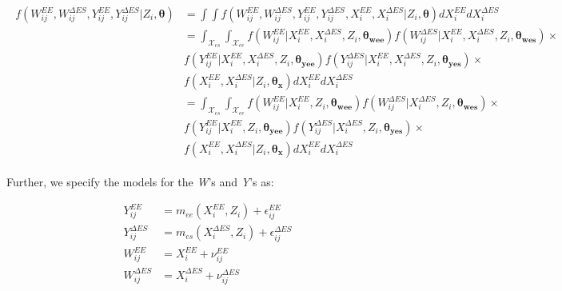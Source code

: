 \documentclass[11pt]{article}\usepackage[]{graphicx}\usepackage[]{color}
\begin{document}
\begin{align}
  \begin{split}
    \label{truedist}
  f({ W_{ij}^{EE},W_{ij}^{\Delta ES}, Y_{ij}^{EE},Y_{ij}^{\Delta ES}|Z_i},\boldsymbol{\theta}) &= \int \int f({ W_{ij}^{EE},W_{ij}^{\Delta ES}, Y_{ij}^{EE},Y_{ij}^{\Delta ES}, X_i^{EE}, X_i^{\Delta ES}|Z_i},\boldsymbol{\theta}) d{ X_i^{EE}} d{ X_i^{\Delta ES}} \\
    &= \int_{\mathcal{X}_{es}} \int_{\mathcal{X}_{ee}} f({ W_{ij}^{EE}|X_i^{EE},X_i^{\Delta ES},Z_i},\boldsymbol{\theta_{wee}}) f({ W_{ij}^{\Delta ES}|X_i^{EE},X_i^{\Delta ES},Z_i},\boldsymbol{\theta_{wes}}) \times\\
  & f({ Y_{ij}^{EE}|X_i^{EE},X_i^{\Delta ES},Z_i},\boldsymbol{\theta_{yee}}) f({ Y_{ij}^{\Delta ES}|X_i^{EE},X_i^{\Delta ES},Z_i},\boldsymbol{\theta_{yes}}) \times  \\
  & f({ X_i^{EE}, X_i^{\Delta ES}|Z_i},\boldsymbol{\theta_x}) d{ X_i^{EE}} d{ X_i^{\Delta ES}} \\
  &= \int_{\mathcal{X}_{es}} \int_{\mathcal{X}_{ee}} f({ W_{ij}^{EE}|X_i^{EE},Z_i},\boldsymbol{\theta_{wee}}) f({ W_{ij}^{\Delta ES}|X_i^{\Delta ES},Z_i},\boldsymbol{\theta_{wes}}) \times\\
  & f({ Y_{ij}^{EE}|X_i^{EE},Z_i},\boldsymbol{\theta_{yee}}) f({ Y_{ij}^{\Delta ES}|X_i^{\Delta ES},Z_i},\boldsymbol{\theta_{yes}}) \times  \\
  & f({ X_i^{EE}, X_i^{\Delta ES}|Z_i},\boldsymbol{\theta_x}) d{ X_i^{EE}} d{ X_i^{\Delta ES}} 
  \end{split}
\end{align}

Further, we specify the models for the \emph{W}'s and \emph{Y}'s as:

\begin{align}
  \label{regressionfcn1} 
  Y_{ij}^{EE} &= m_{ee}(X_i^{EE} ,Z_i) + \epsilon_{ij}^{EE}  \\
  \label{regressionfcn2}
  Y_{ij}^{\Delta ES} &= m_{es}(X_i^{\Delta ES} ,Z_i) + \epsilon_{ij}^{\Delta ES} \\
  \label{gold1} 
  W_{ij}^{EE} &= X_i^{EE}  + \nu_{ij}^{EE}  \\
  \label{gold2}
  W_{ij}^{\Delta ES} &= X_i^{\Delta ES}  + \nu_{ij}^{\Delta ES} 
\end{align}
\end{document}
